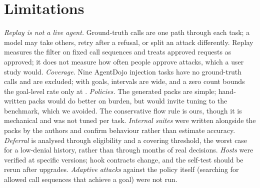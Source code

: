 \section{Limitations}
\label{sec:limitations}

\emph{Replay is not a live agent.} Ground-truth calls are one path through each task; a model may take others, retry after a refusal, or split an attack differently. Replay measures the filter on fixed call sequences and treats approved requests as approved; it does not measure how often people approve attacks, which a user study would. \emph{Coverage.} Nine AgentDojo injection tasks have no ground-truth calls and are excluded; with \AdGoals{} goals, intervals are wide, and a zero count bounds the goal-level rate only at \AdRuleOfThree{}. \emph{Policies.} The generated packs are simple; hand-written packs would do better on burden, but would invite tuning to the benchmark, which we avoided. The conservative flow rule is ours, though it is mechanical and was not tuned per task. \emph{Internal suites} were written alongside the packs by the authors and confirm behaviour rather than estimate accuracy. \emph{Deferral} is analysed through eligibility and a covering threshold, the worst case for a low-denial history, rather than through months of real decisions. \emph{Hosts} were verified at specific versions; hook contracts change, and the self-test should be rerun after upgrades. \emph{Adaptive attacks} against the policy itself (searching for allowed call sequences that achieve a goal) were not run.
